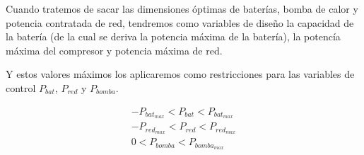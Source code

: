 Cuando tratemos de sacar las dimensiones óptimas de baterías, bomba de calor y
potencia contratada de red, tendremos como variables de diseño la capacidad de
la batería (de la cual se deriva la potencia máxima de la batería), la potencía
máxima del compresor y potencia máxima de red.

Y estos valores máximos los aplicaremos como restricciones para las variables
de control $P_{bat}$, $P_{red}$ y $P_{bomba}$.

\begin{align}
	-P_{bat_{max}} < P_{bat} < P_{bat_{max}} \\
	-P_{red_{max}} < P_{red} < P_{red_{max}} \\
	0 < P_{bomba} < P_{bomba_{max}}
\end{align}
